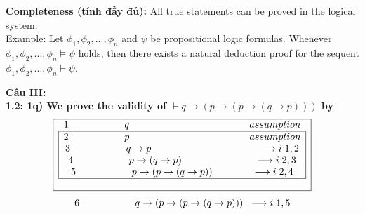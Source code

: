 \documentclass[a4paper]{article}
\begin{document}
\textbf{{\large\hspace{1.5 cm} Completeness (tính đầy đủ): }}
{\large All true statements can be proved in the logical system.\\

\hspace{1.5 cm} Example: Let $\phi_{1},\phi_{2}, . . . , \phi_{n}$ and $\psi$ be propositional logic formulas. Whenever $\phi_{1},\phi_{2}, . . . , \phi_{n} \models \psi$ holds, then there exists a natural deduction proof for the sequent $\phi_{1},\phi_{2}, . . . , \phi_{n} \vdash \psi$.}

\newpage

\textbf{{\Large Câu III: }}
\\

\textbf{{\large\hspace{1 cm} 1.2: 1q) We prove the validity of $\vdash q \rightarrow (p \rightarrow (p \rightarrow (q \rightarrow p)))$ by}}
{\large $$\begin{array}{|c|}
\hline 
\textcolor{black}{1 \hspace{2 cm} q \hspace{4.3 cm} assumption}\\ 
\begin{array}{|c|}
\hline 
\textcolor{black}{2 \hspace{2 cm} p \hspace{4.3 cm} assumption} \\ 
\textcolor{black}{3 \hspace{2 cm} q \rightarrow p \hspace{3.8 cm} \longrightarrow i \hspace{0.1 cm}1,2} \\ 
\textcolor{black}{4 \hspace{2 cm} p \rightarrow (q \rightarrow p) \hspace{2.6 cm} \longrightarrow i \hspace{0.1 cm}2,3} \\ 
\textcolor{black}{5 \hspace{2 cm} p \rightarrow (p \rightarrow (q \rightarrow p)) \hspace{1.4 cm} \longrightarrow i \hspace{0.1 cm}2,4} \\ 
\hline 
\end{array} \\
\\
\hline
\end{array} \\$$ $$\textcolor{black}{6 \hspace{2 cm} q \rightarrow (p \rightarrow (p \rightarrow (q \rightarrow p))) \hspace{0.2 cm} \longrightarrow i \hspace{0.1 cm}1,5} \\ $$}
\end{document}
